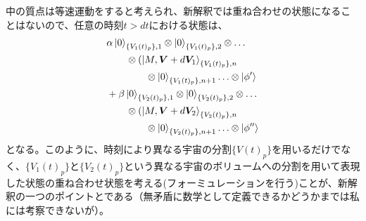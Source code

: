 中の質点は等速運動をすると考えられ、新解釈では重ね合わせの状態になることはないので、任意の時刻$t>dt$における状態は、
\begin{equation}
\begin{aligned}
    &\alpha \ket{0}_{\{V_1(t)_p\},1}  \otimes \ket{0}_{\{V_1(t)_p\},2} \otimes \ldots \\ 
    & \qquad \otimes (\ket{M,\bm{V}+d\bm{V}_1}_{\{V_1(t)_p\},n} \\
    & \qquad \qquad \otimes \ket{0}_{\{V_1(t)_p\},n+1} \ldots \otimes \ket{\phi'} \\ 
    & + \beta \ket{0}_{\{V_2(t)_p\},1}  \otimes \ket{0}_{\{V_2(t)_p\},2} \otimes \ldots \\ 
    & \qquad \otimes (\ket{M,\bm{V}+d\bm{V}_2}_{\{V_2(t)_p\},n} \\
    & \qquad \qquad \otimes \ket{0}_{\{V_2(t)_p\},n+1} \ldots \otimes \ket{\phi''} 
\end{aligned}
\end{equation}
となる。このように、時刻により異なる宇宙の分割$\{V(t)_p\}$を用いるだけでなく、$\{V_1(t)_p\}$と$\{V_2(t)_p\}$という異なる宇宙のボリュームへの分割を用いて表現した状態の重ね合わせ状態を考える(フォーミュレーションを行う)ことが、新解釈の一つのポイントとである（無矛盾に数学として定義できるかどうかまでは私には考察できないが）。
